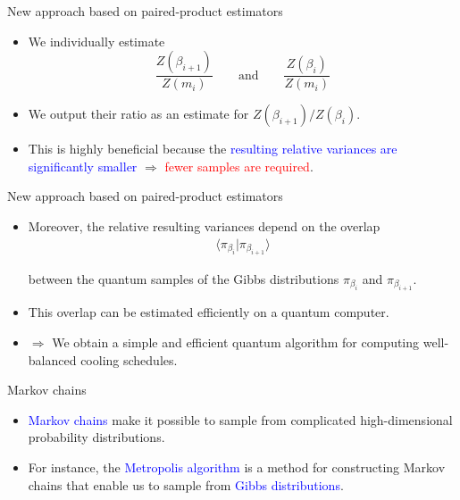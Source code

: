 \documentclass{beamer}
\renewcommand{\>}{\rangle}
\newcommand{\<}{\langle}
\begin{document}
\begin{frame}{New approach based on paired-product estimators}
\begin{itemize}
    \item We individually estimate 
        \begin{equation*}
            \frac{Z(\beta_{i+1})}{Z(m_i)} \quad\quad \mbox{and} \quad\quad
            \frac{Z(\beta_{i})}{Z(m_i)}
        \end{equation*}
    
    \bigskip
    \item We output their ratio as an estimate for $Z(\beta_{i+1})/Z(\beta_i)$.

    \bigskip
    \item This is highly beneficial because the \textcolor{blue}{resulting relative variances are significantly smaller} $\Rightarrow$ \textcolor{red}{fewer samples are required}.
\end{itemize}
    
\end{frame}

%

\begin{frame}{New approach based on paired-product estimators}
\begin{itemize}
    \item Moreover, the relative resulting variances depend on the overlap 
    \begin{align*}
        \<\pi_{\beta_i} | \pi_{\beta_{i+1}} \>
    \end{align*}
    
    between the quantum samples of the Gibbs distributions $\pi_{\beta_i}$ and $\pi_{\beta_{i+1}}$.
    
    \medskip
    \item This overlap can be estimated efficiently on a quantum computer.
    
    \medskip
    \item $\Longrightarrow$ We obtain a simple and efficient quantum algorithm for computing well-balanced cooling schedules.
\end{itemize}
    
\end{frame}

%

\begin{frame}{Markov chains}
\begin{itemize}
    \item \textcolor{blue}{Markov chains} make it possible to sample from complicated high-dimensional probability distributions.

    \medskip
    \item For instance, the \textcolor{blue}{Metropolis algorithm} is a method for constructing Markov chains that enable us to sample from \textcolor{blue}{Gibbs distributions}.
\end{itemize}
\end{frame}
\end{document}
